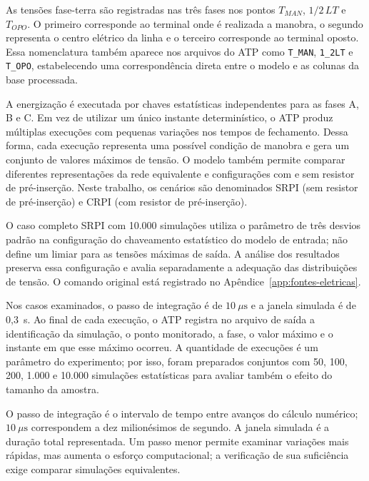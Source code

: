 \documentclass[
	12pt,				%
	openright,			%
	oneside,			%
	a4paper,			%
	chapter=TITLE,		%
	section=TITLE,		%
	subsection=TITLE,	%
	subsubsection=TITLE,%
	english,			%
	brazilian			%
	]{abntex2}
\theoremstyle{definition}
\begin{document}
As tensões fase-terra são registradas nas três fases nos pontos
$T_{MAN}$, $1/2\,LT$ e $T_{OPO}$. O primeiro corresponde ao terminal onde é
realizada a manobra, o segundo representa o centro elétrico da linha e o
terceiro corresponde ao terminal oposto. Essa nomenclatura também aparece nos
arquivos do ATP como \texttt{T\_MAN}, \texttt{1\_2LT} e \texttt{T\_OPO},
estabelecendo uma correspondência direta entre o modelo e as colunas da base
processada.


A energização é executada por chaves estatísticas independentes para as fases
A, B e C. Em vez de utilizar um único instante determinístico, o ATP produz
múltiplas execuções com pequenas variações nos tempos de fechamento. Dessa
forma, cada execução representa uma possível condição de manobra e gera um
conjunto de valores máximos de tensão. O modelo também permite comparar
diferentes representações da rede equivalente e configurações com e sem
resistor de pré-inserção. Neste trabalho, os cenários são denominados SRPI (sem
resistor de pré-inserção) e CRPI (com resistor de pré-inserção).

O caso completo SRPI com 10.000 simulações utiliza o parâmetro de três
desvios padrão na configuração do chaveamento estatístico do modelo de entrada;
não define um limiar para as tensões máximas de saída. A análise dos
resultados preserva essa configuração e avalia separadamente a adequação
das distribuições de tensão. O comando original está registrado no
Apêndice~\ref{app:fontes-eletricas}.

Nos casos examinados, o passo de integração é de $10~\mu\text{s}$ e a janela
simulada é de 0,3~s. Ao final de cada execução, o ATP registra no arquivo de
saída a identificação da simulação, o ponto monitorado, a fase, o valor máximo
e o instante em que esse máximo ocorreu. A quantidade de execuções é um
parâmetro do experimento; por isso, foram preparados conjuntos com 50, 100,
200, 1.000 e 10.000 simulações estatísticas para avaliar também o efeito do
tamanho da amostra.

O passo de integração é o intervalo de tempo entre avanços do cálculo
numérico; $10~\mu\text{s}$ correspondem a dez milionésimos de segundo.
A janela simulada é a duração total representada. Um passo menor permite
examinar variações mais rápidas, mas aumenta o esforço computacional;
a verificação de sua suficiência exige comparar simulações equivalentes.
\end{document}
